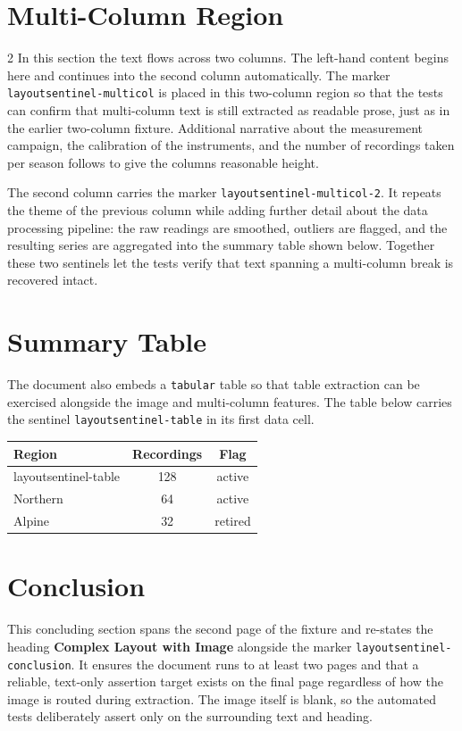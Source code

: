 \documentclass{article}
\begin{document}
\section{Multi-Column Region}
\begin{multicols}{2}
In this section the text flows across two columns. The left-hand content
begins here and continues into the second column automatically. The marker
\texttt{layoutsentinel-multicol} is placed in this two-column region so that
the tests can confirm that multi-column text is still extracted as readable
prose, just as in the earlier two-column fixture. Additional narrative about
the measurement campaign, the calibration of the instruments, and the number of
recordings taken per season follows to give the columns reasonable height.

The second column carries the marker \texttt{layoutsentinel-multicol-2}. It
repeats the theme of the previous column while adding further detail about the
data processing pipeline: the raw readings are smoothed, outliers are flagged,
and the resulting series are aggregated into the summary table shown below.
Together these two sentinels let the tests verify that text spanning a
multi-column break is recovered intact.
\end{multicols}

\section{Summary Table}
The document also embeds a \texttt{tabular} table so that table extraction can
be exercised alongside the image and multi-column features. The table below
carries the sentinel \texttt{layoutsentinel-table} in its first data cell.

\begin{center}
\begin{tabular}{lcc}
\toprule
Region & Recordings & Flag \\
\midrule
layoutsentinel-table & 128 & active \\
Northern & 64 & active \\
Alpine & 32 & retired \\
\bottomrule
\end{tabular}
\end{center}

\section{Conclusion}
This concluding section spans the second page of the fixture and re-states the
heading \textbf{Complex Layout with Image} alongside the marker
\texttt{layoutsentinel-conclusion}. It ensures the document runs to at least
two pages and that a reliable, text-only assertion target exists on the final
page regardless of how the image is routed during extraction. The image itself
is blank, so the automated tests deliberately assert only on the surrounding
text and heading.
\end{document}
